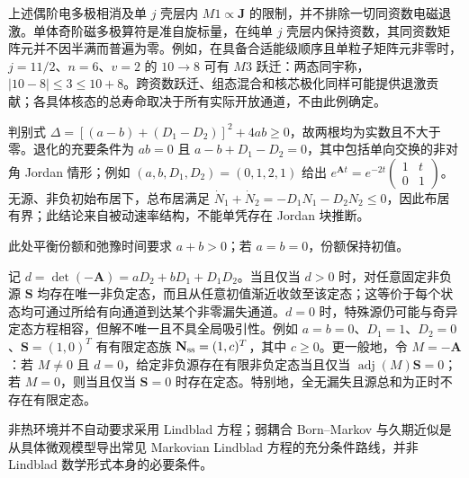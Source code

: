 上述偶阶电多极相消及单 $j$ 壳层内 $M1\propto\mathbf J$ 的限制，并不排除一切同资数电磁退激。单体奇阶磁多极算符是准自旋标量，在纯单 $j$ 壳层内保持资数，其同资数矩阵元并不因半满而普遍为零。例如，在具备合适能级顺序且单粒子矩阵元非零时，$j=11/2$、$n=6$、$v=2$ 的 $10\to8$ 可有 $M3$ 跃迁：两态同宇称，$|10-8|\le3\le10+8$。跨资数跃迁、组态混合和核芯极化同样可能提供退激贡献；各具体核态的总寿命取决于所有实际开放通道，不由此例确定。

判别式 $\Delta=[(a-b)+(D_1-D_2)]^2+4ab\ge0$，故两根均为实数且不大于零。退化的充要条件为 $ab=0$ 且 $a-b+D_1-D_2=0$，其中包括单向交换的非对角 Jordan 情形；例如 $(a,b,D_1,D_2)=(0,1,2,1)$ 给出 $e^{\mathbf A t}=e^{-2t}\begin{pmatrix}1&t\\0&1\end{pmatrix}$。无源、非负初始布居下，总布居满足 $\dot N_1+\dot N_2=-D_1N_1-D_2N_2\le0$，因此布居有界；此结论来自被动速率结构，不能单凭存在 Jordan 块推断。

此处平衡份额和弛豫时间要求 $a+b>0$；若 $a=b=0$，份额保持初值。

记 $d=\det(-\mathbf A)=aD_2+bD_1+D_1D_2$。当且仅当 $d>0$ 时，对任意固定非负源 $\mathbf S$ 均存在唯一非负定态，而且从任意初值渐近收敛至该定态；这等价于每个状态均可通过所给有向通道到达某个非零漏失通道。$d=0$ 时，特殊源仍可能与奇异定态方程相容，但解不唯一且不具全局吸引性。例如 $a=b=0$、$D_1=1$、$D_2=0$、$\mathbf S=(1,0)^T$ 有有限定态族 $\mathbf N_{\rm ss}=(1,c)^T$，其中 $c\ge0$。更一般地，令 $M=-\mathbf A$：若 $M\ne0$ 且 $d=0$，给定非负源存在有限非负定态当且仅当 $\operatorname{adj}(M)\mathbf S=0$；若 $M=0$，则当且仅当 $\mathbf S=0$ 时存在定态。特别地，全无漏失且源总和为正时不存在有限定态。

非热环境并不自动要求采用 Lindblad 方程；弱耦合 Born--Markov 与久期近似是从具体微观模型导出常见 Markovian Lindblad 方程的充分条件路线，并非 Lindblad 数学形式本身的必要条件。
